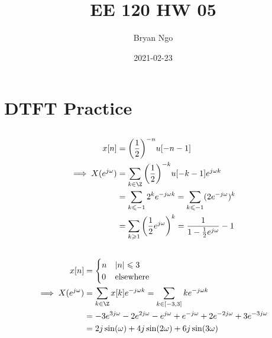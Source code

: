 \documentclass{article}
\title{EE 120 HW 05}
\author{Bryan Ngo}
\date{2021-02-23}
\begin{document}
\maketitle

\section{DTFT Practice}

\subsection{}

\begin{align}
    x[n] &= \qty(\frac{1}{2})^{-n} u[-n - 1] \\
    \implies X(e^{j \omega}) &= \sum_{k \in \Z} \qty(\frac{1}{2})^{-k} u[-k - 1] e^{j \omega k} \\
    &= \sum_{k \leqslant -1} 2^k e^{-j \omega k} = \sum_{k \leqslant -1} (2e^{-j \omega})^k \\
    &= \sum_{k \geqslant 1} \qty(\frac{1}{2} e^{j \omega})^k = \frac{1}{1 - \frac{1}{2}e^{j \omega}} - 1 \\
\end{align}

\subsection{}

\begin{align}
    x[n] &=
    \begin{cases}
        n & |n| \leqslant 3 \\
        0 & \text{elsewhere}
    \end{cases} \\
    \implies X(e^{j \omega}) &= \sum_{k \in \Z} x[k] e^{-j \omega k} = \sum_{k \in [-3, 3]} k e^{-j \omega k} \\
    &= -3e^{3j \omega} - 2 e^{2j \omega} - e^{j \omega} + e^{-j \omega} + 2e^{-2j \omega} + 3e^{-3j \omega} \\
    &= 2j \sin(\omega) + 4j \sin(2\omega) + 6j \sin(3\omega)
\end{align}

\subsection{}
\end{document}

